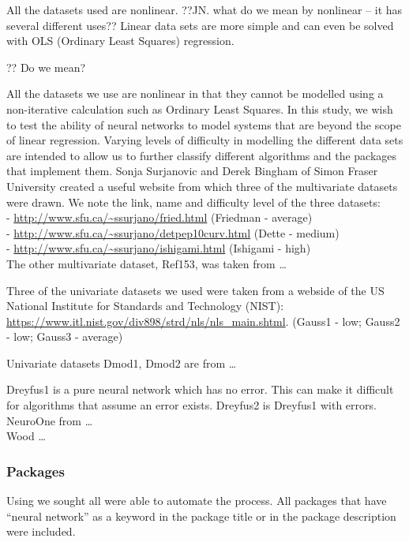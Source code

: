 All the datasets used are nonlinear. ??JN. what do we mean by nonlinear
-- it has several different uses?? Linear data sets are more simple and
can even be solved with OLS (Ordinary Least Squares) regression.

?? Do we mean?

All the datasets we use are nonlinear in that they cannot be modelled
using a non-iterative calculation such as Ordinary Least Squares. In
this study, we wish to test the ability of neural networks to model
systems that are beyond the scope of linear regression. Varying levels
of difficulty in modelling the different data sets are intended to allow
us to further classify different algorithms and the packages that
implement them. Sonja Surjanovic and Derek Bingham of Simon Fraser
University created a useful website from which three of the multivariate
datasets were drawn. We note the link, name and difficulty level of the
three datasets:\\
- \url{http://www.sfu.ca/~ssurjano/fried.html} (Friedman - average)\\
- \url{http://www.sfu.ca/~ssurjano/detpep10curv.html} (Dette - medium)\\
- \url{http://www.sfu.ca/~ssurjano/ishigami.html} (Ishigami - high)\\
The other multivariate dataset, Ref153, was taken from \ldots{}

Three of the univariate datasets we used were taken from a webside of
the US National Institute for Standards and Technology (NIST):
\url{https://www.itl.nist.gov/div898/strd/nls/nls_main.shtml}. (Gauss1 -
low; Gauss2 - low; Gauss3 - average)

Univariate datasets Dmod1, Dmod2 are from \ldots{}

Dreyfus1 is a pure neural network which has no error. This can make it
difficult for algorithms that assume an error exists. Dreyfus2 is
Dreyfus1 with errors. NeuroOne from \ldots{}\\
Wood \ldots{}

\hypertarget{packages}{%
\subsubsection{Packages}\label{packages}}

Using  \citep{R-RWsearch} we sought all were able to
automate the process. All packages that have ``neural network'' as a
keyword in the package title or in the package description were
included.


